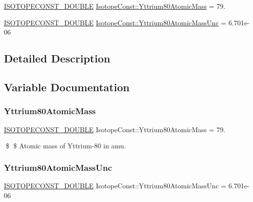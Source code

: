 \begin{DoxyCompactItemize}
\item 
\mbox{\hyperlink{group___isotope_const-_macros_ga8f45a7272ce02c0b4c65c44636ed719a}{I\+S\+O\+T\+O\+P\+E\+C\+O\+N\+S\+T\+\_\+\+D\+O\+U\+B\+LE}} \mbox{\hyperlink{group___isotope_const-_yttrium-_y80_gadf0d96ede4e139aec88fd36be1a5d982}{Isotope\+Const\+::\+Yttrium80\+Atomic\+Mass}} = 79.
\item 
\mbox{\hyperlink{group___isotope_const-_macros_ga8f45a7272ce02c0b4c65c44636ed719a}{I\+S\+O\+T\+O\+P\+E\+C\+O\+N\+S\+T\+\_\+\+D\+O\+U\+B\+LE}} \mbox{\hyperlink{group___isotope_const-_yttrium-_y80_ga252d55197822d23342ea21af1286b27d}{Isotope\+Const\+::\+Yttrium80\+Atomic\+Mass\+Unc}} = 6.\+701e-\/06
\end{DoxyCompactItemize}


\subsection{Detailed Description}


\subsection{Variable Documentation}
\mbox{\label{group___isotope_const-_yttrium-_y80_gadf0d96ede4e139aec88fd36be1a5d982}} 
\subsubsection{\texorpdfstring{Yttrium80\+Atomic\+Mass}{Yttrium80AtomicMass}}
{\footnotesize\ttfamily \mbox{\hyperlink{group___isotope_const-_macros_ga8f45a7272ce02c0b4c65c44636ed719a}{I\+S\+O\+T\+O\+P\+E\+C\+O\+N\+S\+T\+\_\+\+D\+O\+U\+B\+LE}} Isotope\+Const\+::\+Yttrium80\+Atomic\+Mass = 79.}

\$ \$ Atomic mass of Yttrium-\/80 in amu. \mbox{\label{group___isotope_const-_yttrium-_y80_ga252d55197822d23342ea21af1286b27d}} 
\subsubsection{\texorpdfstring{Yttrium80\+Atomic\+Mass\+Unc}{Yttrium80AtomicMassUnc}}
{\footnotesize\ttfamily \mbox{\hyperlink{group___isotope_const-_macros_ga8f45a7272ce02c0b4c65c44636ed719a}{I\+S\+O\+T\+O\+P\+E\+C\+O\+N\+S\+T\+\_\+\+D\+O\+U\+B\+LE}} Isotope\+Const\+::\+Yttrium80\+Atomic\+Mass\+Unc = 6.\+701e-\/06}

